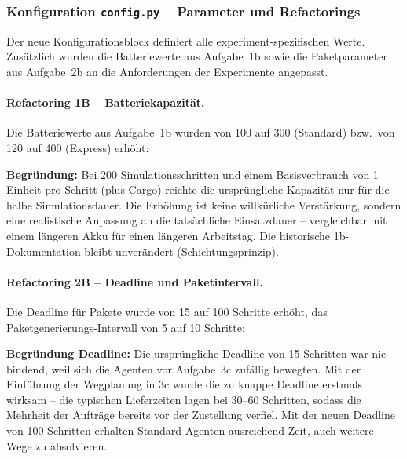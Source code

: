 
\subsubsection{Konfiguration \texttt{config.py} – Parameter und Refactorings}

Der neue Konfigurationsblock definiert alle experiment-spezifischen Werte. Zusätzlich wurden die Batteriewerte aus Aufgabe~1b sowie die Paketparameter aus Aufgabe~2b an die Anforderungen der Experimente angepasst.

\paragraph{Refactoring 1B – Batteriekapazität.}
Die Batteriewerte aus Aufgabe~1b wurden von 100 auf 300 (Standard) bzw.\ von 120 auf 400 (Express) erhöht:



\textbf{Begründung:} Bei 200 Simulationsschritten und einem Basisverbrauch von 1 Einheit pro Schritt (plus Cargo) reichte die ursprüngliche Kapazität nur für die halbe Simulationsdauer. Die Erhöhung ist keine willkürliche Verstärkung, sondern eine realistische Anpassung an die tatsächliche Einsatzdauer -- vergleichbar mit einem längeren Akku für einen längeren Arbeitstag. Die historische 1b-Dokumentation bleibt unverändert (Schichtungsprinzip).

\paragraph{Refactoring 2B – Deadline und Paketintervall.}
Die Deadline für Pakete wurde von 15 auf 100 Schritte erhöht, das Paketgenerierungs-Intervall von 5 auf 10 Schritte:



\textbf{Begründung Deadline:} Die ursprüngliche Deadline von 15 Schritten war nie bindend, weil sich die Agenten vor Aufgabe~3c zufällig bewegten. Mit der Einführung der Wegplanung in 3c wurde die zu knappe Deadline erstmals wirksam -- die typischen Lieferzeiten lagen bei 30--60 Schritten, sodass die Mehrheit der Aufträge bereits vor der Zustellung verfiel. Mit der neuen Deadline von 100 Schritten erhalten Standard-Agenten ausreichend Zeit, auch weitere Wege zu absolvieren.


